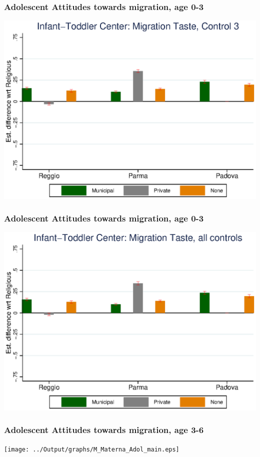 \documentclass{beamer}
\begin{document}
\begin{frame}\frametitle{Adolescent Attitudes towards migration, age 0-3}
\center
\includegraphics[scale=0.7]{../Output/graphs/M_Asilo_Adol_right.eps}
\end{frame}

\begin{frame}\frametitle{Adolescent Attitudes towards migration, age 0-3}
\center
\includegraphics[scale=0.7]{../Output/graphs/M_Asilo_Adol_all.eps}
\end{frame}


\begin{frame}\frametitle{Adolescent Attitudes towards migration, age 3-6}
\center
\texttt{[image: ../Output/graphs/M\_Materna\_Adol\_main.eps]}
\end{frame}
\end{document}
